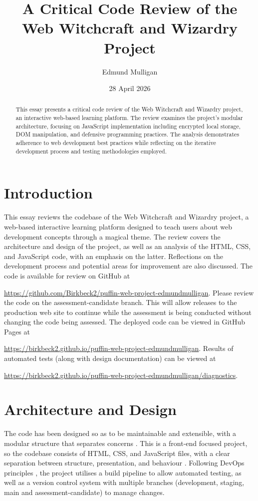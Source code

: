 \documentclass[a4paper, 12pt]{article}
\title{A Critical Code Review of the Web Witchcraft and Wizardry Project}
\author{Edmund Mulligan}
\date{28 April 2026}
\begin{document}


\maketitle

\begin{abstract}
This essay presents a critical code review of the Web Witchcraft and Wizardry project, an interactive web-based learning platform. The review examines the project's modular architecture, focusing on JavaScript implementation including encrypted local storage, DOM manipulation, and defensive programming practices. The analysis demonstrates adherence to web development best practices while reflecting on the iterative development process and testing methodologies employed.
\end{abstract}

\tableofcontents
\newpage

\section{Introduction}
This essay reviews the codebase of the Web Witchcraft and Wizardry project, a web-based interactive learning platform designed to teach users about web development concepts through a magical theme. The review covers the architecture and design of the project, as well as an analysis of the HTML, CSS, and JavaScript code, with an emphasis on the latter. Reflections on the development process and potential areas for improvement are also discussed. The code is available for review on GitHub at 

\url{https://github.com/Birkbeck2/puffin-web-project-edmundmulligan}. Please review the code on the assessment-candidate branch. This will allow releases to the production web site to continue while the assessment is being conducted without changing the code being assessed. The deployed code can be viewed in GitHub Pages at 

\url{https://birkbeck2.github.io/puffin-web-project-edmundmulligan}. Results of automated tests (along with design documentation) can be viewed at 

\url{https://birkbeck2.github.io/puffin-web-project-edmundmulligan/diagnostics}.

\section{Architecture and Design}
The code has been designed so as to be maintainable and extensible, with a modular structure that separates concerns \citep{dijkstra1982role}. This is a front-end focused project, so the codebase consists of HTML, CSS, and JavaScript files, with a clear separation between structure, presentation, and behaviour \citep{keith2010domscripting}. Following DevOps principles \citep{allman2018devops}, the project utilises a build pipeline to allow automated testing, as well as a version control system with multiple branches (development, staging, main and assessment-candidate) to manage changes.
\end{document}
